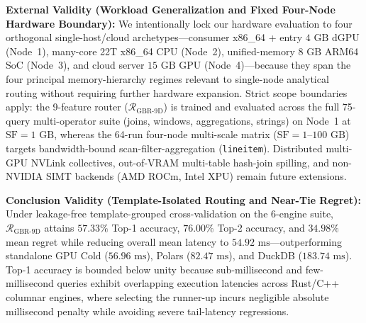 \documentclass[10pt,a4paper]{article}
\begin{document}
\noindent\textbf{External Validity (Workload Generalization and Fixed Four-Node Hardware Boundary):} We intentionally lock our hardware evaluation to four orthogonal single-host/cloud archetypes---consumer x86\_64 + entry $4\text{ GB}$ dGPU (Node~1), many-core 22T x86\_64 CPU (Node~2), unified-memory $8\text{ GB}$ ARM64 SoC (Node~3), and cloud server $15\text{ GB}$ GPU (Node~4)---because they span the four principal memory-hierarchy regimes relevant to single-node analytical routing without requiring further hardware expansion. Strict scope boundaries apply: the 9-feature router ($\mathcal{R}_{\text{GBR-9D}}$) is trained and evaluated across the full 75-query multi-operator suite (joins, windows, aggregations, strings) on Node~1 at $\text{SF}=1\text{ GB}$, whereas the 64-run four-node multi-scale matrix ($\text{SF}=1\text{--}100\text{ GB}$) targets bandwidth-bound scan-filter-aggregation (\texttt{lineitem}). Distributed multi-GPU NVLink collectives, out-of-VRAM multi-table hash-join spilling, and non-NVIDIA SIMT backends (AMD ROCm, Intel XPU) remain future extensions.

\noindent\textbf{Conclusion Validity (Template-Isolated Routing and Near-Tie Regret):} Under leakage-free template-grouped cross-validation on the 6-engine suite, $\mathcal{R}_{\text{GBR-9D}}$ attains $57.33\%$ Top-1 accuracy, $76.00\%$ Top-2 accuracy, and $34.98\%$ mean regret while reducing overall mean latency to $54.92\text{ ms}$---outperforming standalone GPU Cold ($56.96\text{ ms}$), Polars ($82.47\text{ ms}$), and DuckDB ($183.74\text{ ms}$). Top-1 accuracy is bounded below unity because sub-millisecond and few-millisecond queries exhibit overlapping execution latencies across Rust/C++ columnar engines, where selecting the runner-up incurs negligible absolute millisecond penalty while avoiding severe tail-latency regressions.
\end{document}
